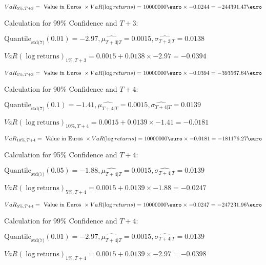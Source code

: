 \indent\indent $VaR_{5\%, T + 3} = \text{ Value in Euros } \times VaR(\log returns) = 10 000 000 \text{\euro} \times-0.0244 = -244391.47 \text{\euro}$\newline




Calculation for 99\% Confidence and $T+3$:

\indent\indent $\text{Quantile}_\text{std(7)}(0.01) = -2.97,\hat{\mu_{T+3|T}} = 0.0015, \hat{\sigma_{T+3|T}} = 0.0138$

\indent\indent $VaR(\log \text{returns})_{1\%, T + 3} = 0.0015 + 0.0138\times-2.97 = -0.0394$

\indent\indent $VaR_{1\%, T + 3} = \text{ Value in Euros } \times VaR(\log returns) = 10 000 000 \text{\euro} \times-0.0394 = -393567.64 \text{\euro}$\newline




Calculation for 90\% Confidence and $T+4$:

\indent\indent $\text{Quantile}_\text{std(7)}(0.1) = -1.41,\hat{\mu_{T+4|T}} = 0.0015, \hat{\sigma_{T+4|T}} = 0.0139$

\indent\indent $VaR(\log \text{returns})_{10\%, T + 4} = 0.0015 + 0.0139\times-1.41 = -0.0181$

\indent\indent $VaR_{10\%, T + 4} = \text{ Value in Euros } \times VaR(\log returns) = 10 000 000 \text{\euro} \times-0.0181 = -181176.27 \text{\euro}$\newline




Calculation for 95\% Confidence and $T+4$:

\indent\indent $\text{Quantile}_\text{std(7)}(0.05) = -1.88,\hat{\mu_{T+4|T}} = 0.0015, \hat{\sigma_{T+4|T}} = 0.0139$

\indent\indent $VaR(\log \text{returns})_{5\%, T + 4} = 0.0015 + 0.0139\times-1.88 = -0.0247$

\indent\indent $VaR_{5\%, T + 4} = \text{ Value in Euros } \times VaR(\log returns) = 10 000 000 \text{\euro} \times-0.0247 = -247231.96 \text{\euro}$\newline




Calculation for 99\% Confidence and $T+4$:

\indent\indent $\text{Quantile}_\text{std(7)}(0.01) = -2.97,\hat{\mu_{T+4|T}} = 0.0015, \hat{\sigma_{T+4|T}} = 0.0139$

\indent\indent $VaR(\log \text{returns})_{1\%, T + 4} = 0.0015 + 0.0139\times-2.97 = -0.0398$

